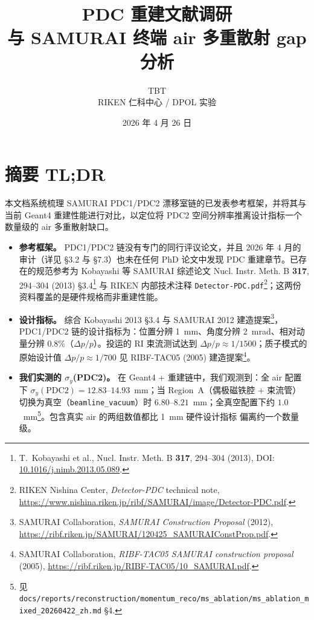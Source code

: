 \documentclass[a4paper, 11pt]{article}
\title{\textbf{PDC 重建文献调研 \\ 与 SAMURAI 终端 air 多重散射 gap 分析}}
\author{TBT \\ RIKEN 仁科中心 / DPOL 实验}
\date{2026 年 4 月 26 日}
\begin{document}
\maketitle
\tableofcontents
\clearpage

\section{摘要 TL;DR}
本文档系统梳理 SAMURAI PDC1/PDC2 漂移室链的已发表参考框架，并将其与当前 Geant4 重建性能进行对比，以定位将 PDC2 空间分辨率推离设计指标一个数量级的 air 多重散射缺口。

\begin{itemize}
  \item \textbf{参考框架。} PDC1/PDC2 链没有专门的同行评议论文，并且 2026 年 4 月的审计（详见 §3.2 与 §7.3）也未在任何 PhD 论文中发现 PDC 重建章节。已存在的规范参考为 Kobayashi 等 SAMURAI 综述论文 Nucl. Instr. Meth. B \textbf{317}, 294--304 (2013) §3.4\footnote{\label{fn:kobayashi2013}T.~Kobayashi et al., Nucl. Instr. Meth. B \textbf{317}, 294--304 (2013), DOI: \href{https://doi.org/10.1016/j.nimb.2013.05.089}{10.1016/j.nimb.2013.05.089}.} 与 RIKEN 内部技术注释 \texttt{Detector-PDC.pdf}\footnote{\label{fn:detectorpdc}RIKEN Nishina Center, \emph{Detector-PDC} technical note, \url{https://www.nishina.riken.jp/ribf/SAMURAI/image/Detector-PDC.pdf}.}；这两份资料覆盖的是硬件规格而非重建性能。
  \item \textbf{设计指标。} 综合 Kobayashi 2013 §3.4 与 SAMURAI 2012 建造提案\footnote{\label{fn:samurai2012}SAMURAI Collaboration, \emph{SAMURAI Construction Proposal} (2012), \url{https://ribf.riken.jp/SAMURAI/120425_SAMURAIConstProp.pdf}.}，PDC1/PDC2 链的设计指标为：位置分辨 1~mm、角度分辨 2~mrad、相对动量分辨 0.8\%（$\Delta p/p$）。投运的 RI 束流测试达到 $\Delta p/p \approx 1/1500$；质子模式的原始设计值 $\Delta p/p \approx 1/700$ 见 RIBF-TAC05 (2005) 建造提案\footnote{\label{fn:ribftac05}SAMURAI Collaboration, \emph{RIBF-TAC05 SAMURAI construction proposal} (2005), \url{https://ribf.riken.jp/RIBF-TAC05/10_SAMURAI.pdf}.}。
  \item \textbf{我们实测的 $\sigma_y$(PDC2)。} 在 Geant4 + 重建链中，我们观测到：全 air 配置下 $\sigma_y(\text{PDC2}) = 12.83$--$14.93$~mm；当 Region~A（偶极磁铁腔 + 束流管）切换为真空（\texttt{beamline\_vacuum}）时 $6.80$--$8.21$~mm；全真空配置下约 $1.0$~mm\footnote{\label{fn:msablation}见 \texttt{docs/reports/reconstruction/momentum\_reco/ms\_ablation/ms\_ablation\_mixed\_20260422\_zh.md} §4.}。包含真实 air 的两组数值都比 1~mm 硬件设计指标 偏离约一个数量级。

\end{itemize}
\end{document}
